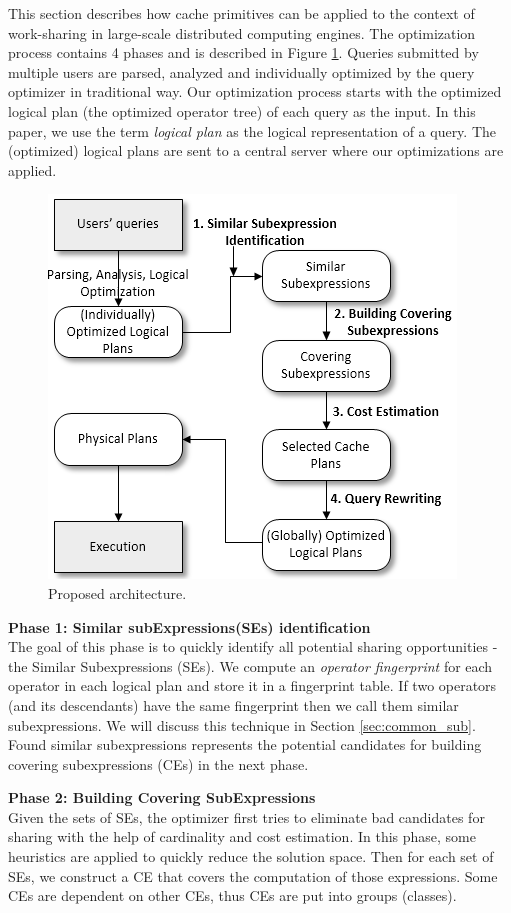 This section describes how cache primitives can be applied to the context of work-sharing in large-scale distributed computing engines. The optimization process contains 4 phases and is described in Figure \ref{fig:phases_mqo}. Queries submitted by multiple users are parsed, analyzed and individually optimized by the query optimizer in traditional way. Our optimization process starts with the optimized logical plan (the optimized operator tree) of each query as the input. In this paper, we use the term \emph{logical plan} as the logical representation of a query. The (optimized) logical plans are sent to a central server where our optimizations are applied.
\begin{figure}[!htb]
	\centering
 	\includegraphics[scale=0.7]{figures/phases_mqo}
   	\caption{Proposed architecture.} 
   	\label{fig:phases_mqo}
\end{figure}

\textbf{Phase 1: Similar subExpressions(SEs) identification}\\
The goal of this phase is to quickly identify all potential sharing opportunities - the Similar Subexpressions (SEs). We compute an \emph{operator fingerprint} for each operator in each logical plan and store it in a fingerprint table. If two operators (and its descendants) have the same fingerprint then we call them similar subexpressions. We will discuss this technique in Section \ref{sec:common_sub}. Found similar subexpressions represents the potential candidates for building covering subexpressions (CEs) in the next phase.

\textbf{Phase 2: Building Covering SubExpressions}\\
Given the sets of SEs, the optimizer first tries to eliminate bad candidates for sharing with the help of cardinality and cost estimation. In this phase, some heuristics are applied to quickly reduce the solution space. Then for each set of SEs, we construct a CE that covers the computation of those expressions. Some CEs are dependent on other CEs, thus CEs are put into groups (classes).

